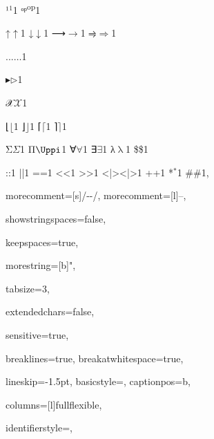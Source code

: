 {{¹}{{\ensuremath{^1}}}1
{ᵒᵖ}{{\color{symbolcolor}\textsuperscript{op}}}1

{↑}{{\color{symbolcolor}\ensuremath{\uparrow}}}1
{↓}{{\color{symbolcolor}\ensuremath{\downarrow}}}1
{⟶}{{\color{symbolcolor}\ensuremath{\longrightarrow}}}1
{⥤}{{\color{symbolcolor}\ensuremath{\Rightarrow}}}1

{...}{{\ensuremath{\ldots}}}1

{▸}{{\ensuremath{\triangleright}}}1

{𝒳}{{\ensuremath{\mathcal{X}}}}1

{⌊}{{\ensuremath{\lfloor}}}1
{⌋}{{\ensuremath{\rfloor}}}1
{⌈}{{\ensuremath{\lceil}}}1
{⌉}{{\ensuremath{\rceil}}}1

{Σ}{{\color{symbolcolor}\ensuremath{\Sigma}}}1
{Π}{{\color{symbolcolor}\ensuremath{\Uppi}}}1 %
{∀}{{\color{symbolcolor}\ensuremath{\forall}}}1
{∃}{{\color{symbolcolor}\ensuremath{\exists}}}1
{λ}{{\color{symbolcolor}\ensuremath{\uplambda}}}1
{\$}{{\color{symbolcolor}\$}}1

{:}{{\color{symbolcolor}:}}1
{|}{{\color{symbolcolor}|}}1
{=}{{\color{symbolcolor}=}}1
{<}{{\color{symbolcolor}<}}1
{>}{{\color{symbolcolor}>}}1
{<|>}{{\color{symbolcolor}<|>}}1
{+}{{\color{symbolcolor}+}}1
{*}{{\color{symbolcolor}\ensuremath{{}^{*}}}}1
{\#}{{\color{keywordcolor}\#}}1, %

morecomment=[s]{/-}{-/},
morecomment=[l]{--},

showstringspaces=false,

keepspaces=true,

morestring=[b]{"},

tabsize=3,

extendedchars=false,

sensitive=true,

breaklines=true,
breakatwhitespace=true,

lineskip={-1.5pt},
basicstyle={\ttfamily},
captionpos=b,

columns=[l]fullflexible,


identifierstyle={\ttfamily\color{black}},

}
